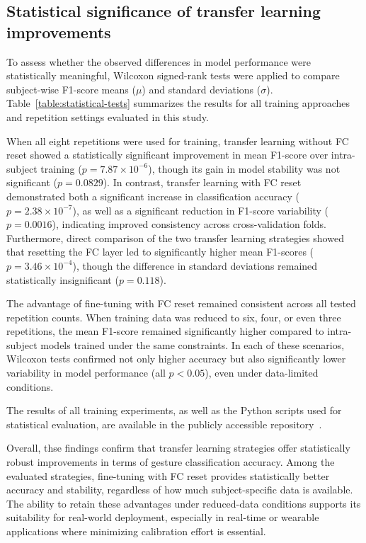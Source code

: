 \begin{multicols}{2}

\subsection*{Statistical significance of transfer learning improvements}

To assess whether the observed differences in model performance were statistically meaningful, Wilcoxon signed-rank tests were applied to compare subject-wise F1-score means ($\mu$) and standard deviations ($\sigma$). Table~\ref{table:statistical-tests} summarizes the results for all training approaches and repetition settings evaluated in this study.

When all eight repetitions were used for training, transfer learning without FC reset showed a statistically significant improvement in mean F1-score over intra-subject training ($p = 7.87 \times 10^{-6}$), though its gain in model stability was not significant ($p = 0.0829$). In contrast, transfer learning with FC reset demonstrated both a significant increase in classification accuracy ($p = 2.38 \times 10^{-7}$), as well as a significant reduction in F1-score variability ($p = 0.0016$), indicating improved consistency across cross-validation folds. Furthermore, direct comparison of the two transfer learning strategies showed that resetting the FC layer led to significantly higher mean F1-scores ($p = 3.46 \times 10^{-4}$), though the difference in standard deviations remained statistically insignificant ($p = 0.118$).

The advantage of fine-tuning with FC reset remained consistent across all tested repetition counts. When training data was reduced to six, four, or even three repetitions, the mean F1-score remained significantly higher compared to intra-subject models trained under the same constraints. In each of these scenarios, Wilcoxon tests confirmed not only higher accuracy but also significantly lower variability in model performance (all $p < 0.05$), even under data-limited conditions.

The results of all training experiments, as well as the Python scripts used for statistical evaluation, are available in the publicly accessible repository~\cite{Kolomiiets2025}.

Overall, thse findings confirm that transfer learning strategies offer statistically robust improvements in terms of gesture classification accuracy. Among the evaluated strategies, fine-tuning with FC reset provides statistically better accuracy and stability, regardless of how much subject-specific data is available. The ability to retain these advantages under reduced-data conditions supports its suitability for real-world deployment, especially in real-time or wearable applications where minimizing calibration effort is essential.


\end{multicols}
